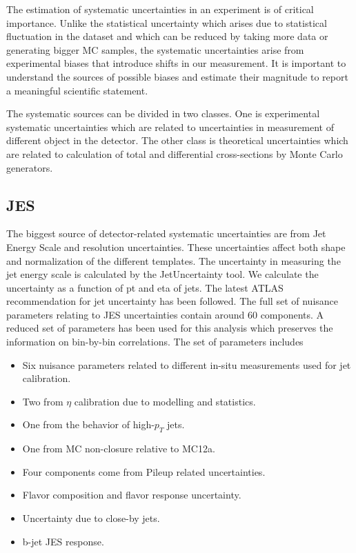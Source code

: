The estimation of systematic uncertainties in an experiment is of critical importance. Unlike the statistical uncertainty which arises due to statistical fluctuation in the dataset and which can be reduced by taking more data or generating bigger MC samples, the systematic uncertainties arise from experimental biases that introduce shifts in our measurement. It is important to understand the sources of possible biases and estimate their magnitude to report a meaningful scientific statement. 

The systematic sources can be divided in two classes. One is experimental systematic uncertainties which are related to uncertainties in measurement of different object in the detector. The other class is theoretical uncertainties which are related to calculation of total and differential cross-sections by Monte Carlo generators. 
\subsection{JES}
The biggest source of detector-related systematic uncertainties are from Jet Energy Scale and resolution uncertainties. These uncertainties affect both shape and normalization of the different templates. The uncertainty in measuring the jet energy scale is calculated by the JetUncertainty tool. We calculate the uncertainty as a function of pt and eta of jets. The latest ATLAS recommendation for jet uncertainty has been followed. The full set of nuisance parameters relating to JES uncertainties contain around 60 components. A reduced set of parameters has been used for this analysis which preserves the information on bin-by-bin correlations. The set of parameters includes
\begin{itemize}
\item Six nuisance parameters related to different in-situ measurements used for jet calibration.
\item Two from $\eta$ calibration due to modelling and statistics.
\item One from the behavior of high-$p_{T}$ jets.
\item One from MC non-closure relative to MC12a.
\item Four components come from Pileup related uncertainties.
\item Flavor composition and flavor response uncertainty.
\item Uncertainty due to close-by jets.
\item b-jet JES response.
\end{itemize} 



